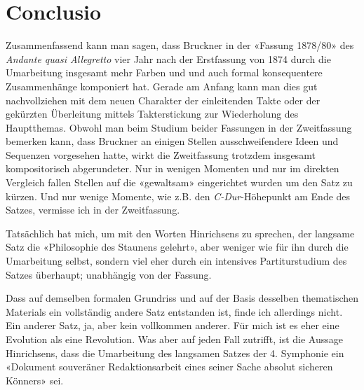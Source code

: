 \section{Conclusio}

Zusammenfassend kann man sagen, dass Bruckner in der «Fassung 1878/80» des \emph{Andante quasi Allegretto} vier Jahr nach der Erstfassung von 1874 durch die Umarbeitung insgesamt mehr Farben und und auch formal konsequentere Zusammenhänge komponiert hat.
Gerade am Anfang kann man dies gut nachvollziehen mit dem neuen Charakter der einleitenden Takte oder der gekürzten Überleitung mittels Takterstickung zur Wiederholung des Hauptthemas.
Obwohl man beim Studium beider Fassungen in der Zweitfassung bemerken kann, dass Bruckner an einigen Stellen ausschweifendere Ideen und Sequenzen vorgesehen hatte, wirkt die Zweitfassung trotzdem insgesamt kompositorisch abgerundeter.
Nur in wenigen Momenten und nur im direkten Vergleich fallen Stellen auf die «gewaltsam» eingerichtet wurden um den Satz zu kürzen.
Und nur wenige Momente, wie z.B. den \emph{C-Dur}-Höhepunkt am Ende des Satzes, vermisse ich in der Zweitfassung.

Tatsächlich hat mich, um mit den Worten Hinrichsens zu sprechen, der langsame Satz die «Philosophie des Staunens gelehrt», aber weniger wie für ihn durch die Umarbeitung selbst, sondern viel eher durch ein intensives Partiturstudium des Satzes überhaupt; unabhängig von der Fassung.

Dass auf demselben formalen Grundriss und auf der Basis desselben thematischen Materials ein vollständig andere Satz entstanden ist, finde ich allerdings nicht.
Ein anderer Satz, ja, aber kein vollkommen anderer.
Für mich ist es eher eine Evolution als eine Revolution.
Was aber auf jeden Fall zutrifft, ist die Aussage Hinrichsens, dass die Umarbeitung des langsamen Satzes der 4. Symphonie ein «Dokument souveräner Redaktionsarbeit eines seiner Sache absolut sicheren Könners» sei.
